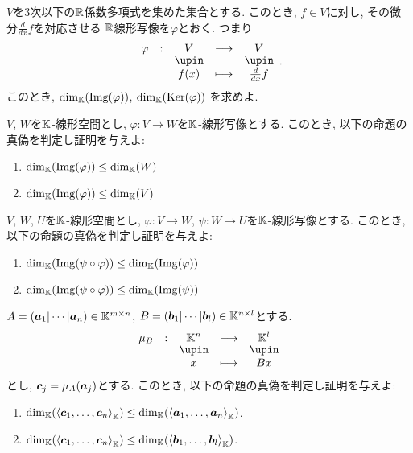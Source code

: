 \begin{quiz}
  $V$を$3$次以下の$\mathbb{R}$係数多項式を集めた集合とする.
  このとき,
  $f\in V$に対し, その微分$\frac{d}{dx}f$を対応させる
  $\mathbb{R}$線形写像を$\varphi$とおく. つまり
  \begin{align*}
    \shazo{\varphi}{V}{V}
    {f(x)}{\frac{d}{dx}f}.
  \end{align*}
  このとき,
  $\dim_{\mathbb{K}}(\operatorname{Img}(\varphi))$,
  $\dim_{\mathbb{K}}(\operatorname{Ker}(\varphi))$
  を求めよ.
\end{quiz}


\begin{quiz}
  $V$, $W$を$\mathbb{K}$-線形空間とし,
  $\varphi\colon V\to W$を$\mathbb{K}$-線形写像とする.
  このとき,
  以下の命題の真偽を判定し証明を与えよ:
  \begin{enumerate}
  \item $\dim_{\mathbb{K}}(\operatorname{Img}(\varphi))\leq \dim_{\mathbb{K}}(W)$
  \item $\dim_{\mathbb{K}}(\operatorname{Img}(\varphi))\leq \dim_{\mathbb{K}}(V)$
  \end{enumerate}
\end{quiz}

\begin{quiz}
  $V$, $W$, $U$を$\mathbb{K}$-線形空間とし,
  $\varphi\colon V\to W$,
  $\psi\colon W\to U$を$\mathbb{K}$-線形写像とする. 
 このとき,
  以下の命題の真偽を判定し証明を与えよ:
  \begin{enumerate}
  \item $\dim_{\mathbb{K}}(\operatorname{Img}(\psi\circ\varphi))\leq \dim_{\mathbb{K}}(\operatorname{Img}(\varphi))$
  \item $\dim_{\mathbb{K}}(\operatorname{Img}(\psi\circ\varphi))\leq \dim_{\mathbb{K}}(\operatorname{Img}(\psi))$
  \end{enumerate}
\end{quiz}

\begin{quiz}
  $A=(\boldsymbol{a}_1|\cdots|\boldsymbol{a}_n)\in \mathbb{K}^{m\times n}$, $B=(\boldsymbol{b}_1|\cdots|\boldsymbol{b}_l)\in\mathbb{K}^{n\times l}$とする.
  \begin{align*}
    \shazo{\mu_B}{\KK^{n}}{\KK^{l}}
    {x}{Bx}
  \end{align*}
  とし, $\boldsymbol{c}_j=\mu_A(\boldsymbol{a}_j)$とする.
  このとき,
  以下の命題の真偽を判定し証明を与えよ:
  \begin{enumerate}
  \item $\dim_{\mathbb{K}}(\Braket{\boldsymbol{c}_1,\ldots,\boldsymbol{c}_n}_{\mathbb{K}})\leq \dim_{\mathbb{K}}(\Braket{\boldsymbol{a}_1,\ldots,\boldsymbol{a}_n}_{\mathbb{K}})$.
  \item $\dim_{\mathbb{K}}(\Braket{\boldsymbol{c}_1,\ldots,\boldsymbol{c}_n}_{\mathbb{K}})\leq \dim_{\mathbb{K}}(\Braket{\boldsymbol{b}_1,\ldots,\boldsymbol{b}_l}_{\mathbb{K}})$.
  \end{enumerate}
\end{quiz}

